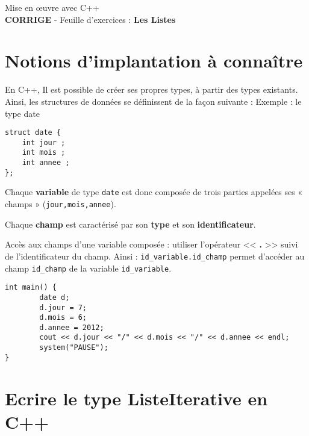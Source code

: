 \documentclass[french]{article}
\begin{document}
	
	\begin{minipage}{\textwidth}
\begin{center}

{\Large Mise en œuvre avec C++ \\ {\color{red}\textbf{CORRIGE}} - Feuille d'exercices : \textbf{Les Listes}}
\end{center}
	\end{minipage}
	
	\section*{Notions d'implantation à connaître}
	En C++, Il est possible de créer ses propres types, à partir des types existants.
	Ainsi, les structures de données se définissent de la façon suivante :
	Exemple : le type date
	
	\begin{lstlisting}[caption={le type \textbf{date}}]
struct date {
	int jour ; 
	int mois ; 
	int annee ;
};
	\end{lstlisting}
	
	Chaque \textbf{variable} de type \texttt{date} est donc composée de trois parties appelées ses « champs » (\texttt{jour,mois,annee}). 
	
	Chaque \textbf{champ} est caractérisé par son \textbf{type} et son \textbf{identificateur}.
	
	Accès aux champs d'une variable composée : utiliser l’opérateur << \textbf{.} >> suivi de l’identificateur du champ. Ainsi : \texttt{id\_variable.id\_champ} permet d’accéder au champ \texttt{id\_champ} de la variable \texttt{id\_variable}.
	
	\begin{lstlisting}[caption={Utilisation du type date}]
int main() {
    	date d;
    	d.jour = 7;
    	d.mois = 6;
    	d.annee = 2012;
    	cout << d.jour << "/" << d.mois << "/" << d.annee << endl;
    	system("PAUSE");
}
	\end{lstlisting}
	
	\section{Ecrire le type ListeIterative en C++}
\end{document}
